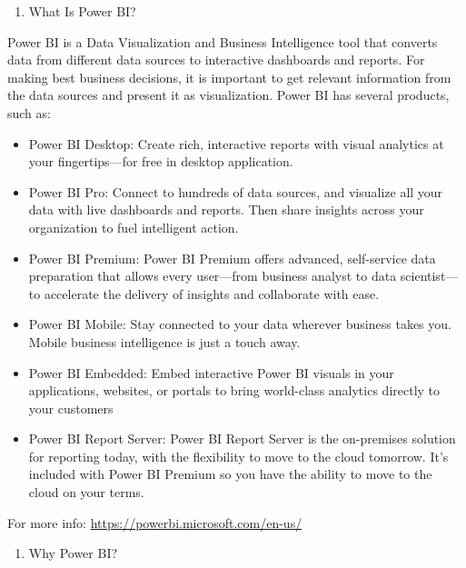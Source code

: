 \documentclass[]{book}
\providecommand{\tightlist}{%
  \setlength{\itemsep}{0pt}\setlength{\parskip}{0pt}}
\begin{document}
\begin{enumerate}
\def\labelenumi{\arabic{enumi}.}
\tightlist
\item
  What Is Power BI?
\end{enumerate}

Power BI is a Data Visualization and Business Intelligence tool that
converts data from different data sources to interactive dashboards and
reports. For making best business decisions, it is important to get
relevant information from the data sources and present it as
visualization. Power BI has several products, such as:

\begin{itemize}
\tightlist
\item
  Power BI Desktop: Create rich, interactive reports with visual
  analytics at your fingertips---for free in desktop application.
\item
  Power BI Pro: Connect to hundreds of data sources, and visualize all
  your data with live dashboards and reports. Then share insights across
  your organization to fuel intelligent action.
\item
  Power BI Premium: Power BI Premium offers advanced, self-service data
  preparation that allows every user---from business analyst to data
  scientist---to accelerate the delivery of insights and collaborate
  with ease.
\item
  Power BI Mobile: Stay connected to your data wherever business takes
  you. Mobile business intelligence is just a touch away.
\item
  Power BI Embedded: Embed interactive Power BI visuals in your
  applications, websites, or portals to bring world-class analytics
  directly to your customers
\item
  Power BI Report Server: Power BI Report Server is the on-premises
  solution for reporting today, with the flexibility to move to the
  cloud tomorrow. It's included with Power BI Premium so you have the
  ability to move to the cloud on your terms.
\end{itemize}

For more info: \url{https://powerbi.microsoft.com/en-us/}

\begin{enumerate}
\def\labelenumi{\arabic{enumi}.}
\setcounter{enumi}{1}
\tightlist
\item
  Why Power BI?
\end{enumerate}
\end{document}
